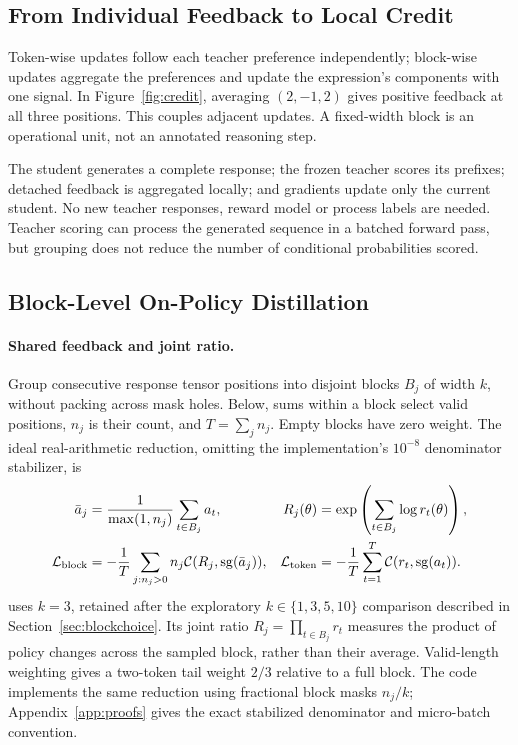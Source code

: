 \subsection{From Individual Feedback to Local Credit}
Token-wise updates follow each teacher preference independently; block-wise updates aggregate the preferences and update the expression's components with one signal. In Figure~\ref{fig:credit}, averaging $(2,-1,2)$ gives positive feedback at all three positions. This couples adjacent updates. A fixed-width block is an operational unit, not an annotated reasoning step.

The student generates a complete response; the frozen teacher scores its prefixes; detached feedback is aggregated locally; and gradients update only the current student. No new teacher responses, reward model or process labels are needed. Teacher scoring can process the generated sequence in a batched forward pass, but grouping does not reduce the number of conditional probabilities scored.

\subsection{Block-Level On-Policy Distillation}
\paragraph{Shared feedback and joint ratio.}
Group consecutive response tensor positions into disjoint blocks $B_j$ of width $k$, without packing across mask holes. Below, sums within a block select valid positions, $n_j$ is their count, and $T=\sum_j n_j$. Empty blocks have zero weight. The ideal real-arithmetic reduction, omitting the implementation's $10^{-8}$ denominator stabilizer, is
\begin{align}
 \bar a_j&=\frac{1}{\max(1,n_j)}\sum_{t\in B_j}a_t,
 &R_j(\theta)&=\exp\left(\sum_{t\in B_j}\log r_t(\theta)\right),\label{eq:block}\\
 \mathcal L_{\mathrm{block}}&=-\frac1T\sum_{j:n_j>0}n_j\mathcal C(R_j,\operatorname{sg}(\bar a_j)),
 &\mathcal L_{\mathrm{token}}&=-\frac1T\sum_{t=1}^T\mathcal C(r_t,\operatorname{sg}(a_t)).\label{eq:loss}
\end{align}
\method{} uses $k=3$, retained after the exploratory $k\in\{1,3,5,10\}$ comparison described in Section~\ref{sec:blockchoice}. Its joint ratio $R_j=\prod_{t\in B_j}r_t$ measures the product of policy changes across the sampled block, rather than their average. Valid-length weighting gives a two-token tail weight $2/3$ relative to a full block. The code implements the same reduction using fractional block masks $n_j/k$; Appendix~\ref{app:proofs} gives the exact stabilized denominator and micro-batch convention.

